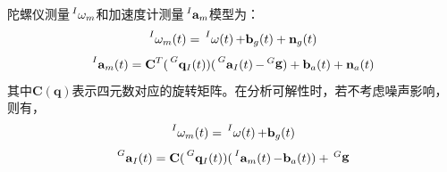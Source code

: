 \documentclass{article}
\begin{document}
\par
陀螺仪测量$\sideset{^I}{}{\mathop{\mathbf{\omega}_m}}$和加速度计测量$\sideset{^I}{}{\mathop{\mathbf{a}_m}}$模型为：
\begin{equation}
    \sideset{^I}{}{\mathop{\mathbf{\omega}_{m}(t)}}=\sideset{^I}{}{\mathop{\mathbf{\omega}(t)}}
    +\textbf{b}_{g}(t)+\textbf{n}_{g}(t)
\end{equation}
\begin{equation}
    \sideset{^I}{}{\mathop{\mathbf{a}_{m}(t)}}=\textbf{C}^T(\sideset{^G}{}{\mathop{\mathbf{q}_{I}(t)}})
    (\sideset{^G}{}{\mathop{\mathbf{a}_{I}(t)}}-\sideset{^G}{}{\mathop{\mathbf{g}}})
    +\textbf{b}_{a}(t)+\textbf{n}_{a}(t)
\end{equation}
其中$\textbf{C}(\mathbf{q})$表示四元数对应的旋转矩阵。在分析可解性时，若不考虑噪声影响，则有，
\begin{equation}
    \sideset{^I}{}{\mathop{\mathbf{\omega}_{m}(t)}}=\sideset{^I}{}{\mathop{\mathbf{\omega}(t)}}
    +\textbf{b}_{g}(t)
\end{equation}
\begin{equation}
    \sideset{^G}{}{\mathop{\mathbf{a}_{I}(t)}}=\textbf{C}(\sideset{^G}{}{\mathop{\mathbf{q}_{I}(t)}})
    (\sideset{^I}{}{\mathop{\mathbf{a}_{m}(t)}}-\textbf{b}_{a}(t))
    +\sideset{^G}{}{\mathop{\mathbf{g}}}
\end{equation}
\end{document}
